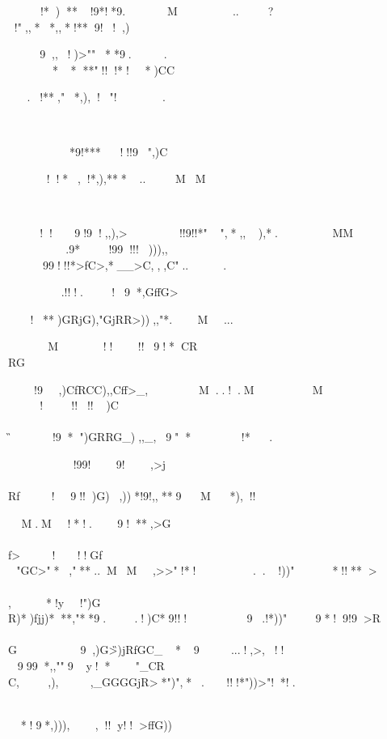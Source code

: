 	!*)**!9*!*9.
M

..
?
!",,**,,*!**9!!,)	


9,,!)>""**9.
.


****"!!!*!*)CC

	


.!**,"*,),!"!

.

	




*9!***!!!9",)C

	!!*,!*,),***..

MM

	





!!9!9!,,),>
	
	!!9!!*"",*,,),*.
MM
	
	
.9*!99!!!))),,	99!!!*>fC>,*__>C,,,C"...
	





	.!!!.!9*,GffG>
	
		!**)GRjG),"GjRR>)),,"*.M...

		


M
!!!!9!*CR\\RG


!9,)CfRCC),,Cff>_,M..!.M
	
M	!!!!!)C\\\\\G!9*")GRRG_),,_,9"*!*.


		
	!99!9!,>j\\\\Rf!9!!)G\Rf),))*!9!,,**9M*),!!	


	M.M!*!.9!**,>G\\\\f>!!!Gf\\\,"GC>"*,"**..MM,>>"!*!..!))"*!!**>\\\\\C,*!y!")G\\R)*)fjj)***,"**9..!)C*9!!!9.!*))"9*!9!9>R\\\\G9,)G\G>)jRfGC_*9...!,>,!!
	
999*,,""9y!*"_CR\\C,,),,_GGGGjR\RGGf>*")",*.!!!*"))>"!*!.		
	


*!9*,))),,!!y!!>ffG))